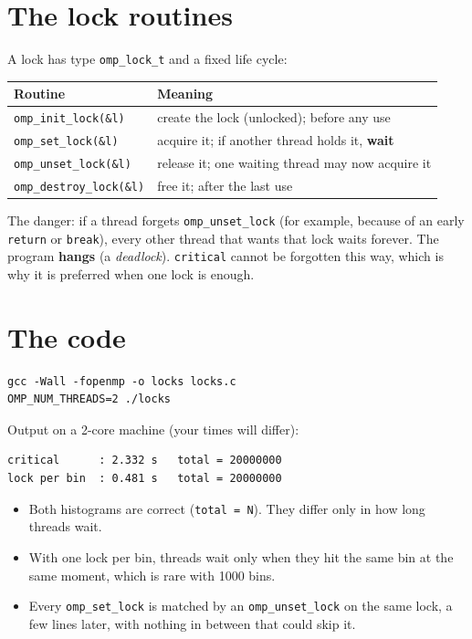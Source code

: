 \documentclass[11pt,a4paper]{article}
\begin{document}
\section{The lock routines}
A lock has type \texttt{omp\_lock\_t} and a fixed life cycle:
\begin{center}
\small
\begin{tabular}{@{}>{\raggedright\arraybackslash}p{4.6cm}>{\raggedright\arraybackslash}p{10.6cm}@{}}
\toprule
Routine & Meaning \\ \midrule
\texttt{omp\_init\_lock(\&l)} & create the lock (unlocked); before any use \\
\texttt{omp\_set\_lock(\&l)} & acquire it; if another thread holds it, \textbf{wait} \\
\texttt{omp\_unset\_lock(\&l)} & release it; one waiting thread may now acquire it \\
\texttt{omp\_destroy\_lock(\&l)} & free it; after the last use \\
\bottomrule
\end{tabular}
\end{center}
The danger: if a thread forgets \texttt{omp\_unset\_lock} (for example, because of an early
\texttt{return} or \texttt{break}), every other thread that wants that lock waits forever.
The program \textbf{hangs} (a \emph{deadlock}). \texttt{critical} cannot be forgotten
this way, which is why it is preferred when one lock is enough.

\section{The code}


\begin{lstlisting}[style=sh]
gcc -Wall -fopenmp -o locks locks.c
OMP_NUM_THREADS=2 ./locks
\end{lstlisting}
Output on a 2-core machine (your times will differ):
\begin{lstlisting}[style=sh]
critical      : 2.332 s   total = 20000000
lock per bin  : 0.481 s   total = 20000000
\end{lstlisting}

\begin{keyidea}
\begin{itemize}
  \item Both histograms are correct (\texttt{total = N}). They differ only in how long
        threads wait.
  \item With one lock per bin, threads wait only when they hit the same bin at the same
        moment, which is rare with 1000 bins.
  \item Every \texttt{omp\_set\_lock} is matched by an \texttt{omp\_unset\_lock} on the
        same lock, a few lines later, with nothing in between that could skip it.
\end{itemize}
\end{keyidea}
\end{document}
